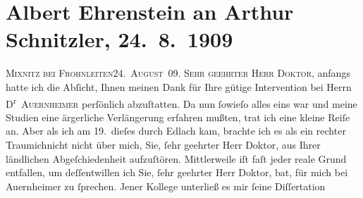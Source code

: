 

               \section[Albert Ehrenstein an Arthur Schnitzler, 24. 8. 1909]{ Albert Ehrenstein an Arthur Schnitzler, 24. 8. 1909}\nopagebreak{}\rehead{ }\begin{ledgroupsized}[t]{13cm}\normalsize\beginnumbering{} \toendnotes[C]{\smallbreak\pagebreak[2]} 
\toendnotes[C]{\smallbreak}\pstart
           {\pb}\textsc{Mixnitz bei Frohnleiten}\hfill \textsc{24. August 09.}\pend
           \pstart{}\textsc{Sehr geehrter Herr Doktor,}\pend\pstart
           anfangs hatte ich die Abſicht, Ihnen meinen Dank für Ihre gütige Intervention bei
                    Herrn D\textsuperscript{r} \textsc{Auernheimer} perſönlich abzuſtatten. Da nun ſowieſo alles eins war und meine Studien
                    eine ärgerliche Verlängerung erfahren mußten, trat ich eine kleine Reiſe an.
                    Aber als ich am 19. dieſes durch Edlach kam, brachte ich es als ein rechter Traumichnicht nicht {\pb}über mich, Sie, ſehr geehrter Herr Doktor, aus Ihrer
                    ländlichen Abgeſchiedenheit aufzuſtören. Mittlerweile iſt faſt jeder reale Grund
                    entfallen, um deſſentwillen ich Sie, ſehr geehrter Herr Doktor, bat, für mich
                    bei Auernheimer zu ſprechen. Jener Kollege unterließ es mir
                    ſeine Diſſertation

\end{ledgroupsized}
